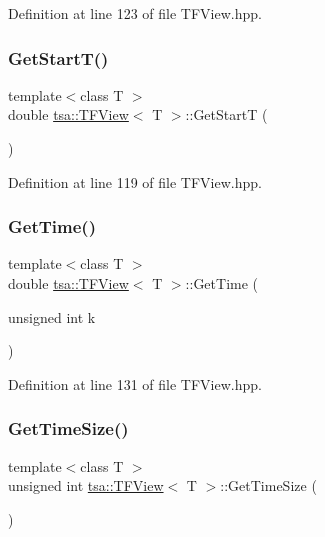 Definition at line 123 of file T\+F\+View.\+hpp.

\mbox{\label{classtsa_1_1_t_f_view_ad8f53724f34669fee2ee12d656c43d51}} 
\subsubsection{\texorpdfstring{Get\+Start\+T()}{GetStartT()}}
{\footnotesize\ttfamily template$<$class T $>$ \\
double \hyperlink{classtsa_1_1_t_f_view}{tsa\+::\+T\+F\+View}$<$ T $>$\+::Get\+StartT (\begin{DoxyParamCaption}{ }\end{DoxyParamCaption})\hspace{0.3cm}{\ttfamily [inline]}}



Definition at line 119 of file T\+F\+View.\+hpp.

\mbox{\label{classtsa_1_1_t_f_view_ab5041c986c79f6daac52fa248ec050cf}} 
\subsubsection{\texorpdfstring{Get\+Time()}{GetTime()}}
{\footnotesize\ttfamily template$<$class T $>$ \\
double \hyperlink{classtsa_1_1_t_f_view}{tsa\+::\+T\+F\+View}$<$ T $>$\+::Get\+Time (\begin{DoxyParamCaption}\item[{unsigned int}]{k }\end{DoxyParamCaption})\hspace{0.3cm}{\ttfamily [inline]}}



Definition at line 131 of file T\+F\+View.\+hpp.

\mbox{\label{classtsa_1_1_t_f_view_ac8b74db7ad7e2aacd1d92b5da737ee3e}} 
\subsubsection{\texorpdfstring{Get\+Time\+Size()}{GetTimeSize()}}
{\footnotesize\ttfamily template$<$class T $>$ \\
unsigned int \hyperlink{classtsa_1_1_t_f_view}{tsa\+::\+T\+F\+View}$<$ T $>$\+::Get\+Time\+Size (\begin{DoxyParamCaption}{ }\end{DoxyParamCaption})\hspace{0.3cm}{\ttfamily [inline]}}



